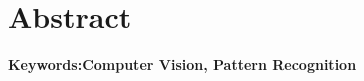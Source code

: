 \chapter*{Abstract}
\label{chap:abstract}





















\textbf{Keywords:Computer Vision, Pattern Recognition}
